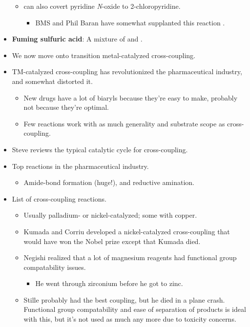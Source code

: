 \documentclass[../notes.tex]{subfiles}
\begin{document}
\begin{itemize}
\begin{itemize}
\begin{itemize}
        \end{itemize}
        \item {} can also covert pyridine \emph{N}-oxide to 2-chloropyridine.
        \begin{itemize}
            \item BMS and Phil Baran have somewhat supplanted this reaction \parencite{bib:PyNOCl}.
        \end{itemize}
    \end{itemize}
    \item \textbf{Fuming sulfuric acid}: A mixture of  and .
    \item We now move onto transition metal-catalyzed cross-coupling.
    \item TM-catalyzed cross-coupling has revolutionized the pharmaceutical industry, and somewhat distorted it.
    \begin{itemize}
        \item New drugs have a lot of biaryls because they're easy to make, probably not because they're optimal.
        \item Few reactions work with as much generality and substrate scope as cross-coupling.
    \end{itemize}
    \item Steve reviews the typical catalytic cycle for cross-coupling.
    \item Top reactions in the pharmaceutical industry.
    \begin{itemize}
        \item Amide-bond formation (huge!), and reductive amination.
    \end{itemize}
    \item List of cross-coupling reactions.
    \begin{itemize}
        \item Usually palladium- or nickel-catalyzed; some with copper.
        \item Kumada and Corriu developed a nickel-catalyzed cross-coupling that would have won the Nobel prize except that Kumada died.
        \item Negishi realized that a lot of magnesium reagents had functional group compatability issues.
        \begin{itemize}
            \item He went through zirconium before he got to zinc.
        \end{itemize}
        \item Stille probably had the best coupling, but he died in a plane crash. Functional group compatability and ease of separation of products is ideal with this, but it's not used as much any more due to toxicity concerns.

\end{itemize}
\end{itemize}
\end{document}
